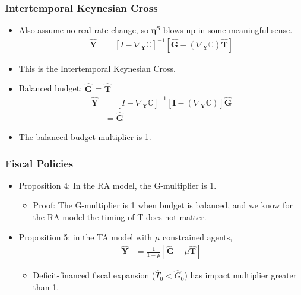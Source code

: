 \documentclass[english,xcolor=svgnames]{beamer}
\begin{document}
\begin{frame}
    \frametitle{Intertemporal Keynesian Cross}
    \begin{itemize}
        \item Also assume no real rate change, so $\bm{\eta^S}$ blows up in some meaningful sense.
        \begin{align*}
        \bm{\hat{Y}} &=    [I - \nabla_{\bm{Y}}\pmb{\mathbb{C}}]^{-1} [\bm{\hat{G}} - (\nabla_{\bm{Y}}\pmb{\mathbb{C}})\bm{\hat{T}}] 
    \end{align*}
    \item This is the Intertemporal Keynesian Cross.
       \item Balanced budget: $\bm{\hat{G}}$ = $\bm{\hat{T}}$
         \begin{align*}
        \bm{\hat{Y}}  & = [I - \nabla_{\bm{Y}}\pmb{\mathbb{C}}]^{-1}  [\bm{I} - (\nabla_{\bm{Y}}\pmb{\mathbb{C}})]\bm{\hat{G}}  \\
                &= \bm{\hat{G}}
    \end{align*}
    \item The balanced budget multiplier is 1.
    \end{itemize}
\end{frame}


\begin{frame}
    \frametitle{Fiscal Policies}
    \begin{itemize}
        \item Proposition 4: In the RA model, the G-multiplier is 1.
        \begin{itemize}
        	\item Proof: The G-multiplier is 1 when budget is balanced, and we know for the RA model the timing of T does not matter.
        \end{itemize}
        \item Proposition 5: in the TA model with $\mu$ constrained agents,
        \begin{align*}
        \bm{\hat{Y}} &=    \frac{1}{1-\mu} [\bm{\hat{G}} - \mu \bm{\hat{T}}] 
    \end{align*}
    \begin{itemize}
        	\item Deficit-financed fiscal expansion ($\hat{T}_0<\hat{G}_0$) has impact multiplier greater than 1.
        \end{itemize}
    \end{itemize}
\end{frame}
\end{document}
